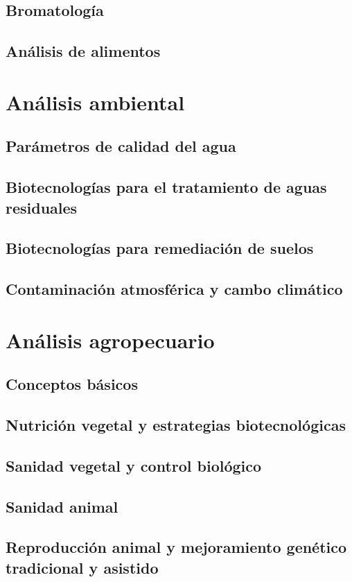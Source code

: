 \documentclass{../summarie}
\begin{document}
    \chapter{Bromatología}
    \chapter{Análisis de alimentos}
        

\part{Análisis ambiental}

    \chapter{Parámetros de calidad del agua}
        
        
    \chapter{Biotecnologías para el tratamiento de aguas residuales}
    \chapter{Biotecnologías para remediación de suelos}
    \chapter{Contaminación atmosférica y cambo climático}

\part{Análisis agropecuario}

    \chapter{Conceptos básicos}
    \chapter{Nutrición vegetal y estrategias biotecnológicas}
    \chapter{Sanidad vegetal y control biológico}
    \chapter{Sanidad animal}
    \chapter{Reproducción animal y mejoramiento genético tradicional y asistido}


\newpage


\end{document}
